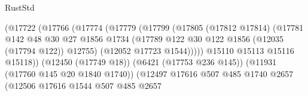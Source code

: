 \begin{lexlean}{RustStd}
\begin{coremodule}
                                              (@17722
                                                (@17766
                                                  (@17774
                                                    (@17779
                                                      (@17799
                                                        (@17805
                                                          (@17812 @17814)
                                                          (@17781
                                                            @142
                                                            @48
                                                            @30
                                                            @27
                                                            @1856
                                                            @1734
                                                            (@17789
                                                              @122
                                                              @30
                                                              @122
                                                              @1856
                                                              (@12035 (@17794 @122))
                                                              @12755)
                                                            (@12052 @17723 @1544)))))
                                                    @15110
                                                    @15113
                                                    @15116
                                                    @15118))
                                                (@12450 (@17749 @18))
                                                (@6421 (@17753 @236 @145))
                                                (@11931 (@17760 @145 @20 @1840 @1740))
                                                (@12497
                                                  @17616
                                                  @507
                                                  @485
                                                  @1740
                                                  @2657
                                                  (@12506
                                                    @17616
                                                    @1544
                                                    @507
                                                    @485
                                                    @2657

\end{coremodule}
\end{lexlean}

